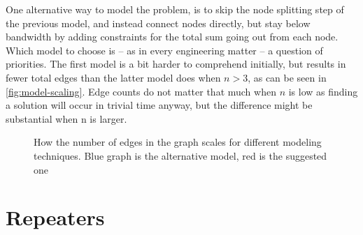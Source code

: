 One alternative way to model the problem, is to skip the node splitting step of the previous model, and instead connect nodes directly, but stay below bandwidth by adding constraints for the total sum going out from each node. Which model to choose is -- as in every engineering matter -- a question of priorities. The first model is a bit harder to comprehend initially, but results in fewer total edges than the latter model does when $n>3$, as can be seen in \autoref{fig:model-scaling}. Edge counts do not matter that much when $n$ is low as finding a solution will occur in trivial time anyway, but the difference might be substantial when n is larger. 

\begin{figure}
    \centering
    \caption{How the number of edges in the graph scales for different modeling techniques. Blue graph is the alternative model, red is the suggested one}
    \label{fig:model-scaling}
\end{figure}


\section{Repeaters}\label{sec:repeaters}

